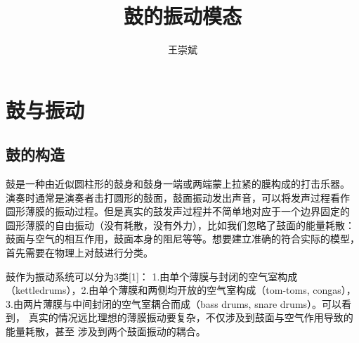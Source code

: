 \documentclass[a4paper]{ctexart}
\title{\textbf{鼓的振动模态}}
\author{王崇斌\;1800011716}
\date{}
\begin{document}
	\pagestyle{fancy}
	\pagestyle{fancy}
	\chead{}
	\rhead{\today}
	\maketitle
	\thispagestyle{fancy}
	\section{鼓与振动}
	\subsection{鼓的构造}
	鼓是一种由近似圆柱形的鼓身和鼓身一端或两端蒙上拉紧的膜构成的打击乐器。
	演奏时通常是演奏者击打圆形的鼓面，鼓面振动发出声音，可以将发声过程看作
	圆形薄膜的振动过程。但是真实的鼓发声过程并不简单地对应于一个边界固定的
	圆形薄膜的自由振动（没有耗散，没有外力），比如我们忽略了鼓面的能量耗散：
	鼓面与空气的相互作用，鼓面本身的阻尼等等。想要建立准确的符合实际的模型，
	首先需要在物理上对鼓进行分类。
	\par 鼓作为振动系统可以分为3类[1]：
	1.由单个薄膜与封闭的空气室构成（kettledrums），2.由单个薄膜和两侧均开放的空气室构成（tom-toms, congas），
	3.由两片薄膜与中间封闭的空气室耦合而成（bass drums, snare drums）。可以看到，
	真实的情况远比理想的薄膜振动要复杂，不仅涉及到鼓面与空气作用导致的能量耗散，甚至
	涉及到两个鼓面振动的耦合。
\end{document}
